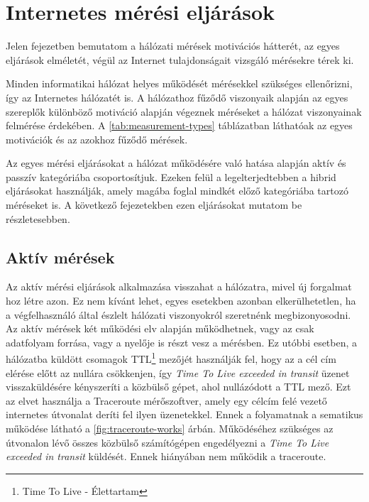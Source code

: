 
\section{Internetes mérési eljárások}
 
 

Jelen fejezetben bemutatom a hálózati mérések motivációs hátterét, az egyes eljárások elméletét, végül az Internet tulajdonságait vizsgáló mérésekre térek ki.

Minden informatikai hálózat helyes működését mérésekkel szükséges ellenőrizni, így az Internetes hálózatét is. A hálózathoz fűződő viszonyaik alapján az egyes szereplők különböző motiváció alapján végeznek méréseket a hálózat viszonyainak felmérése érdekében. A \ref{tab:measurement-types} táblázatban\cite{networkMeasure} láthatóak az egyes motivációk és az azokhoz fűződő mérések. 



Az egyes mérési eljárásokat a hálózat működésére való hatása alapján aktív és passzív kategóriába csoportosítjuk. Ezeken felül a legelterjedtebben a hibrid eljárásokat használják, amely magába foglal mindkét előző kategóriába tartozó méréseket is. A következő fejezetekben ezen eljárásokat mutatom be részletesebben.

\subsection{Aktív mérések}

Az aktív mérési eljárások alkalmazása visszahat a hálózatra, mivel új forgalmat hoz létre azon. Ez nem kívánt lehet, egyes esetekben azonban elkerülhetetlen, ha a végfelhasználó által észlelt hálózati viszonyokról szeretnénk megbizonyosodni.
Az aktív mérések két működési elv alapján működhetnek, vagy az csak adatfolyam forrása, vagy a nyelője is részt vesz a mérésben. Ez utóbbi esetben, a hálózatba küldött csomagok TTL\footnote{Time To Live - Élettartam} mezőjét használják fel, hogy az a cél cím elérése előtt az nullára csökkenjen, így \textit{Time To Live exceeded in transit} üzenet visszaküldésére kényszeríti a közbülső gépet, ahol nullázódott a TTL mező. Ezt az elvet használja a Traceroute mérőszoftver, amely egy célcím felé vezető internetes útvonalat deríti fel ilyen üzenetekkel. Ennek a folyamatnak a sematikus működése látható a \ref{fig:traceroute-works} árbán. Működéséhez szükséges az útvonalon lévő összes közbülső számítógépen engedélyezni a \textit{Time To Live exceeded in transit} küldését. Ennek hiányában nem működik a traceroute.

